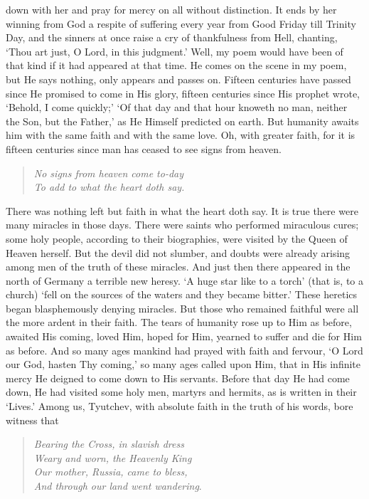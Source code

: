 down with her and pray for mercy on all without distinction. It ends
by her winning from God a respite of suffering every year from Good
Friday till Trinity Day, and the sinners at once raise a cry of
thankfulness from Hell, chanting, `Thou art just, O Lord, in this
judgment.' Well, my poem would have been of that kind if it had
appeared at that time. He comes on the scene in my poem, but He says
nothing, only appears and passes on. Fifteen centuries have passed
since He promised to come in His glory, fifteen centuries since His
prophet wrote, `Behold, I come quickly;' `Of that day and that hour
knoweth no man, neither the Son, but the Father,' as He Himself
predicted on earth. But humanity awaits him with the same faith and
with the same love. Oh, with greater faith, for it is fifteen
centuries since man has ceased to see signs from heaven.

\begin{verse}
\textit{No signs from heaven come to-day\\
To add to what the heart doth say.}
\end{verse}

\noindent There was nothing left but faith in what the heart doth say.
 It is true there were many miracles in those days. There
were saints who performed miraculous cures; some holy people,
according to their biographies, were visited by the Queen of Heaven
herself. But the devil did not slumber, and doubts were already
arising among men of the truth of these miracles. And just then there
appeared in the north of Germany a terrible new heresy. `A huge star
like to a torch' (that is, to a church) `fell on the sources of the
waters and they became bitter.' These heretics began blasphemously
denying miracles. But those who remained faithful were all the more
ardent in their faith. The tears of humanity rose up to Him as before,
awaited His coming, loved Him, hoped for Him, yearned to suffer and
die for Him as before. And so many ages mankind had prayed with faith
and fervour, `O Lord our God, hasten Thy coming,' so many ages called
upon Him, that in His infinite mercy He deigned to come down to His
servants. Before that day He had come down, He had visited some holy
men, martyrs and hermits, as is written in their `Lives.' Among us,
Tyutchev, with absolute faith in the truth of his words, bore witness
that

\begin{verse}
\textit{Bearing the Cross, in slavish dress\\
Weary and worn, the Heavenly King\\
Our mother, Russia, came to bless,\\
And through our land went wandering}.
\end{verse}


